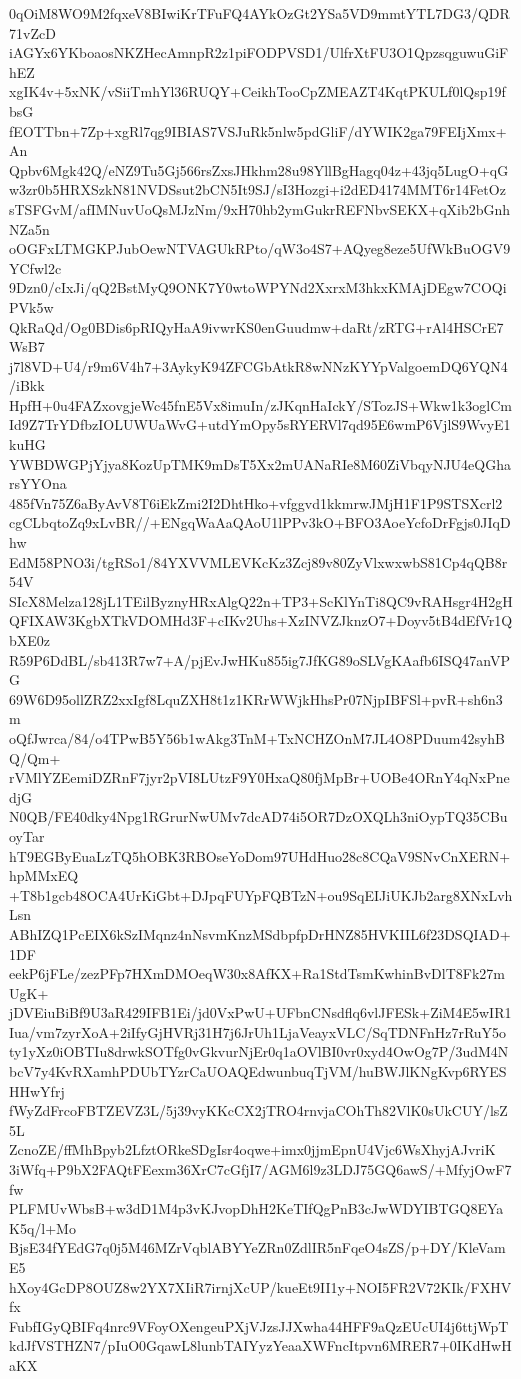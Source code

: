 0qOiM8WO9M2fqxeV8BIwiKrTFuFQ4AYkOzGt2YSa5VD9mmtYTL7DG3/QDR71vZcD
iAGYx6YKboaosNKZHecAmnpR2z1piFODPVSD1/UlfrXtFU3O1QpzsqguwuGiFhEZ
xgIK4v+5xNK/vSiiTmhYl36RUQY+CeikhTooCpZMEAZT4KqtPKULf0lQsp19fbsG
fEOTTbn+7Zp+xgRl7qg9IBIAS7VSJuRk5nlw5pdGliF/dYWIK2ga79FEIjXmx+An
Qpbv6Mgk42Q/eNZ9Tu5Gj566rsZxsJHkhm28u98YllBgHagq04z+43jq5LugO+qG
w3zr0b5HRXSzkN81NVDSsut2bCN5It9SJ/sI3Hozgi+i2dED4174MMT6r14FetOz
sTSFGvM/afIMNuvUoQsMJzNm/9xH70hb2ymGukrREFNbvSEKX+qXib2bGnhNZa5n
oOGFxLTMGKPJubOewNTVAGUkRPto/qW3o4S7+AQyeg8eze5UfWkBuOGV9YCfwl2c
9Dzn0/cIxJi/qQ2BstMyQ9ONK7Y0wtoWPYNd2XxrxM3hkxKMAjDEgw7COQiPVk5w
QkRaQd/Og0BDis6pRIQyHaA9ivwrKS0enGuudmw+daRt/zRTG+rAl4HSCrE7WsB7
j7l8VD+U4/r9m6V4h7+3AykyK94ZFCGbAtkR8wNNzKYYpValgoemDQ6YQN4/iBkk
HpfH+0u4FAZxovgjeWc45fnE5Vx8imuIn/zJKqnHaIckY/STozJS+Wkw1k3oglCm
Id9Z7TrYDfbzIOLUWUaWvG+utdYmOpy5sRYERVl7qd95E6wmP6VjlS9WvyE1kuHG
YWBDWGPjYjya8KozUpTMK9mDsT5Xx2mUANaRIe8M60ZiVbqyNJU4eQGharsYYOna
485fVn75Z6aByAvV8T6iEkZmi2I2DhtHko+vfggvd1kkmrwJMjH1F1P9STSXcrl2
cgCLbqtoZq9xLvBR//+ENgqWaAaQAoU1lPPv3kO+BFO3AoeYcfoDrFgjs0JIqDhw
EdM58PNO3i/tgRSo1/84YXVVMLEVKcKz3Zcj89v80ZyVlxwxwbS81Cp4qQB8r54V
SIcX8Melza128jL1TEilByznyHRxAlgQ22n+TP3+ScKlYnTi8QC9vRAHsgr4H2gH
QFIXAW3KgbXTkVDOMHd3F+cIKv2Uhs+XzINVZJknzO7+Doyv5tB4dEfVr1QbXE0z
R59P6DdBL/sb413R7w7+A/pjEvJwHKu855ig7JfKG89oSLVgKAafb6ISQ47anVPG
69W6D95ollZRZ2xxIgf8LquZXH8t1z1KRrWWjkHhsPr07NjpIBFSl+pvR+sh6n3m
oQfJwrca/84/o4TPwB5Y56b1wAkg3TnM+TxNCHZOnM7JL4O8PDuum42syhBQ/Qm+
rVMlYZEemiDZRnF7jyr2pVI8LUtzF9Y0HxaQ80fjMpBr+UOBe4ORnY4qNxPnedjG
N0QB/FE40dky4Npg1RGrurNwUMv7dcAD74i5OR7DzOXQLh3niOypTQ35CBuoyTar
hT9EGByEuaLzTQ5hOBK3RBOseYoDom97UHdHuo28c8CQaV9SNvCnXERN+hpMMxEQ
+T8b1gcb48OCA4UrKiGbt+DJpqFUYpFQBTzN+ou9SqEIJiUKJb2arg8XNxLvhLsn
ABhIZQ1PcEIX6kSzIMqnz4nNsvmKnzMSdbpfpDrHNZ85HVKIIL6f23DSQIAD+1DF
eekP6jFLe/zezPFp7HXmDMOeqW30x8AfKX+Ra1StdTsmKwhinBvDlT8Fk27mUgK+
jDVEiuBiBf9U3aR429IFB1Ei/jd0VxPwU+UFbnCNsdflq6vlJFESk+ZiM4E5wIR1
Iua/vm7zyrXoA+2iIfyGjHVRj31H7j6JrUh1LjaVeayxVLC/SqTDNFnHz7rRuY5o
ty1yXz0iOBTIu8drwkSOTfg0vGkvurNjEr0q1aOVlBI0vr0xyd4OwOg7P/3udM4N
bcV7y4KvRXamhPDUbTYzrCaUOAQEdwunbuqTjVM/huBWJlKNgKvp6RYESHHwYfrj
fWyZdFrcoFBTZEVZ3L/5j39vyKKcCX2jTRO4rnvjaCOhTh82VlK0sUkCUY/lsZ5L
ZcnoZE/ffMhBpyb2LfztORkeSDgIsr4oqwe+imx0jjmEpnU4Vjc6WsXhyjAJvriK
3iWfq+P9bX2FAQtFEexm36XrC7cGfjI7/AGM6l9z3LDJ75GQ6awS/+MfyjOwF7fw
PLFMUvWbsB+w3dD1M4p3vKJvopDhH2KeTIfQgPnB3cJwWDYIBTGQ8EYaK5q/l+Mo
BjsE34fYEdG7q0j5M46MZrVqblABYYeZRn0ZdlIR5nFqeO4sZS/p+DY/KleVamE5
hXoy4GcDP8OUZ8w2YX7XIiR7irnjXcUP/kueEt9II1y+NOI5FR2V72KIk/FXHVfx
FubfIGyQBIFq4nrc9VFoyOXengeuPXjVJzsJJXwha44HFF9aQzEUcUI4j6ttjWpT
kdJfVSTHZN7/pIuO0GqawL8lunbTAIYyzYeaaXWFncItpvn6MRER7+0IKdHwHaKX
